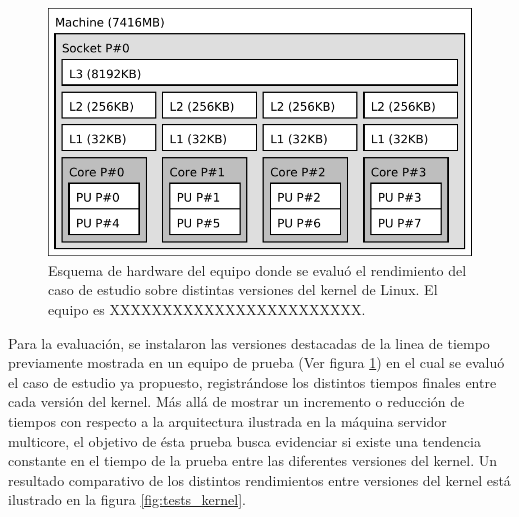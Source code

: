 \begin{figure}[h!]
	\centering
	\includegraphics[scale=0.65]{imagenes/desktopkernelpc.pdf}
	\caption{Esquema de hardware del equipo donde se evaluó el rendimiento del caso de estudio sobre distintas versiones del kernel de Linux. El equipo es XXXXXXXXXXXXXXXXXXXXXXXX.}
	\label{fig:desktop_kernel_pc}
\end{figure}

Para la evaluación, se instalaron las versiones destacadas de la linea de tiempo previamente mostrada en un equipo de prueba (Ver figura \ref{fig:desktop_kernel_pc}) en el cual se evaluó el caso de estudio ya propuesto, registrándose los distintos tiempos finales entre cada versión del kernel. Más allá de mostrar un incremento o reducción de tiempos con respecto a la arquitectura ilustrada en la máquina servidor multicore, el objetivo de ésta prueba busca evidenciar si existe una tendencia constante en el tiempo de la prueba entre las diferentes versiones del kernel. Un resultado comparativo de los distintos rendimientos entre versiones del kernel está ilustrado en la figura \ref{fig:tests_kernel}.

